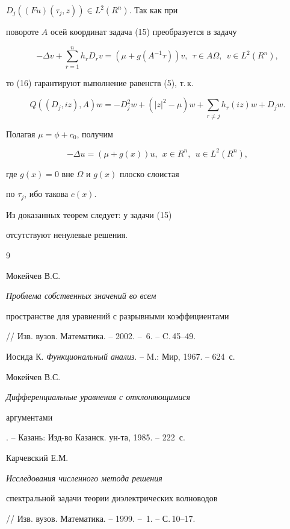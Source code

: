 $D_{j}((Fu)(\tau_{j}, z)) \in L^{2}(R^{n})$. Так как при


повороте $A$ осей координат задача (15) преобразуется в задачу


$$


-\Delta v +\sum _{r=1}^{n} h_{r} D_{r} v =(\mu +


g(A^{-1}\tau)) v, \ \ \tau \in A \Omega , \ \ v\in L^{2}(R^{n}),


$$


то (16) гарантируют выполнение равенств (5), т.\,к.


$$


Q((D_{j}, iz), A) w=-D_{j}^{2} w +(| z | ^{2}-


\mu ) w +\sum_{r \ne j} h_{r} (iz) w +D_{j} w.


$$


Полагая $ \mu=\phi + c_{0}$, получим


$$


-\Delta u = (\mu + g(x)) u, \ \ x \in R^{n}, \ \ u \in L^{2}(R^{n}),


$$


где $g(x)= 0$ вне $\Omega$ и $g(x)$ плоско слоистая


по $\tau_{j}$, ибо такова $c(x)$.





Из доказанных теорем следует: у задачи (15)


отсутствуют ненулевые решения.








\begin{thebibliography}{9}







Мокейчев В.С. {\em Проблема собственных значений во всем


пространстве для уравнений с разрывными коэффициентами} 


// Изв. вузов. Математика. -- 2002. -- \No\,6. -- C.\,45--49. 




Иосида К. {\em Функциональный анализ}. -- M.: Мир, 1967. -- 624~с. 




Мокейчев В.С. {\em Дифференциальные уравнения с отклоняющимися


аргументами}. -- Казань: Изд-во Казанск. ун-та, 1985. -- 222~с. 




Карчевский Е.М. {\em Исследования численного метода решения


спектральной задачи теории диэлектрических волноводов} 


// Изв. вузов. Математика. -- 1999. -- \No\,1. -- С.\,10--17. 





\end{thebibliography}





